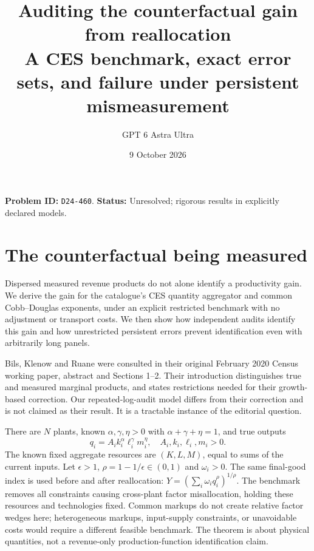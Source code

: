 \documentclass[11pt]{article}
\author{GPT 6 Astra Ultra}
\date{9 October 2026}
\title{Auditing the counterfactual gain from reallocation\\\large A CES benchmark, exact error sets, and failure under persistent mismeasurement}
\theoremstyle{remark}\newtheorem{remark}[theorem]{Remark}
\begin{document}
\maketitle
\noindent\textbf{Problem ID:} \texttt{D24-460}. \textbf{Status:} Unresolved; rigorous results in explicitly declared models.
\section{The counterfactual being measured}
Dispersed measured revenue products do not alone identify a productivity gain. We derive the gain for the catalogue's CES quantity aggregator and common Cobb--Douglas exponents, under an explicit restricted benchmark with no adjustment or transport costs. We then show how independent audits identify this gain and how unrestricted persistent errors prevent identification even with arbitrarily long panels.

Bils, Klenow and Ruane \cite{bkr} were consulted in their original February 2020 Census working paper, abstract and Sections 1--2. Their introduction distinguishes true and measured marginal products, and states restrictions needed for their growth-based correction. Our repeated-log-audit model differs from their correction and is not claimed as their result. It is a tractable instance of the editorial question.

There are $N$ plants, known $\alpha,\gamma,\eta>0$ with $\alpha+\gamma+\eta=1$, and true outputs
\[
 q_i=A_i k_i^\alpha\ell_i^\gamma m_i^\eta,
 \quad A_i,k_i,\ell_i,m_i>0.
\]
The known fixed aggregate resources are $(K,L,M)$, equal to sums of the current inputs. Let $\epsilon>1$, $\rho=1-1/\epsilon\in(0,1)$ and $\omega_i>0$. The same final-good index is used before and after reallocation:
$Y=(\sum_i\omega_iq_i^\rho)^{1/\rho}$.
The benchmark removes all constraints causing cross-plant factor misallocation, holding these resources and technologies fixed. Common markups do not create relative factor wedges here; heterogeneous markups, input-supply constraints, or unavoidable costs would require a different feasible benchmark. The theorem is about physical quantities, not a revenue-only production-function identification claim.
\end{document}
